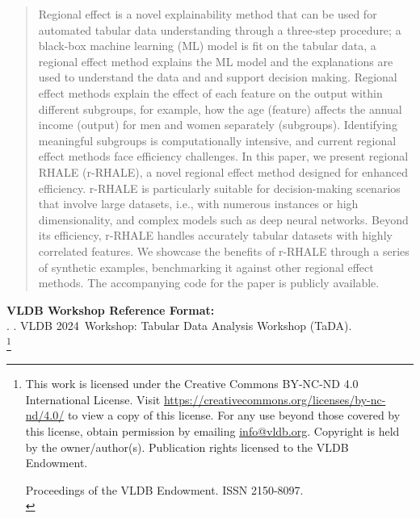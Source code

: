 \documentclass[sigconf, nonacm]{acmart}
\newcommand\vldbyear{2024}
\newcommand\vldbworkshop{Tabular Data Analysis Workshop (TaDA)}
\newcommand\vldbauthors{\authors}
\newcommand\vldbtitle{\shorttitle}
\newcommand\vldbpagestyle{empty}
\begin{document}
\begin{abstract}
Regional effect is a novel explainability method that can be used for automated tabular data understanding through a three-step procedure; a black-box machine learning (ML) model is fit on the tabular data, a regional effect method explains the ML model and the explanations are used to understand the data and and support decision making.  Regional effect methods explain the effect of each feature on the output within different subgroups, for example, how the age (feature) affects the annual income (output) for men and women separately (subgroups). Identifying meaningful subgroups is computationally intensive, and current regional effect methods face efficiency challenges. In this paper, we present regional RHALE (r-RHALE), a novel regional effect method designed for enhanced efficiency. r-RHALE is particularly suitable for decision-making scenarios that involve large datasets, i.e., with numerous instances or high dimensionality, and complex models such as deep neural networks. Beyond its efficiency, r-RHALE handles accurately tabular datasets with highly correlated features. We showcase the benefits of r-RHALE through a series of synthetic examples, benchmarking it against other regional effect methods. The accompanying code for the paper is publicly available.
\end{abstract}

\maketitle

\pagestyle{\vldbpagestyle}
\begingroup\small\noindent\raggedright\textbf{VLDB Workshop Reference Format:}\\
\vldbauthors. \vldbtitle. VLDB \vldbyear\ Workshop: \vldbworkshop.\\ %
\endgroup
\begingroup
\renewcommand\thefootnote{}\footnote{\noindent
This work is licensed under the Creative Commons BY-NC-ND 4.0 International License. Visit \url{https://creativecommons.org/licenses/by-nc-nd/4.0/} to view a copy of this license. For any use beyond those covered by this license, obtain permission by emailing \href{mailto:info@vldb.org}{info@vldb.org}. Copyright is held by the owner/author(s). Publication rights licensed to the VLDB Endowment. \\
\raggedright Proceedings of the VLDB Endowment. %
ISSN 2150-8097. \\
}\addtocounter{footnote}{-1}\endgroup
\end{document}
